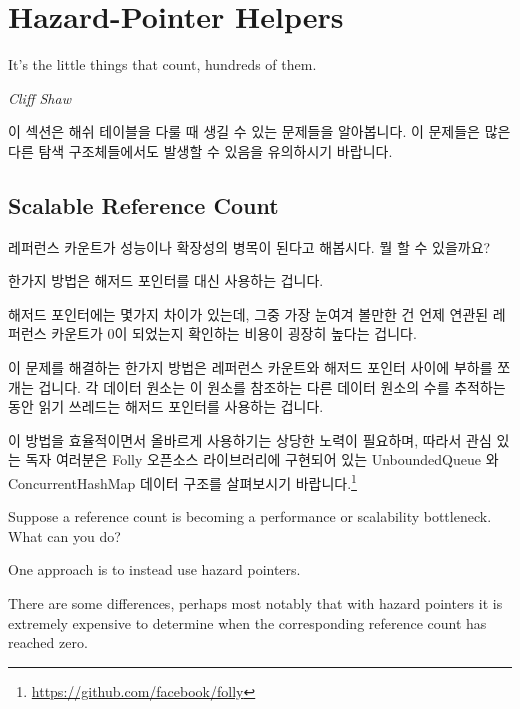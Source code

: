
\section{Hazard-Pointer Helpers}
\label{sec:together:Hazard-Pointer Helpers}
%
\epigraph{It's the little things that count, hundreds of them.}
	 {\emph{Cliff Shaw}}

이 섹션은 해쉬 테이블을 다룰 때 생길 수 있는 문제들을 알아봅니다.
이 문제들은 많은 다른 탐색 구조체들에서도 발생할 수 있음을 유의하시기 바랍니다.

\iffalse

This section looks at some issues that can arise when dealing with
hash tables.
Please note that these issues also apply to many other search structures.

\fi

\subsection{Scalable Reference Count}
\label{sec:together:Scalable Reference Count}

레퍼런스 카운트가 성능이나 확장성의 병목이 된다고 해봅시다.
뭘 할 수 있을까요?

한가지 방법은 해저드 포인터를 대신 사용하는 겁니다.

해저드 포인터에는 몇가지 차이가 있는데, 그중 가장 눈여겨 볼만한 건 언제 연관된
레퍼런스 카운트가 0이 되었는지 확인하는 비용이 굉장히 높다는 겁니다.

이 문제를 해결하는 한가지 방법은 레퍼런스 카운트와 해저드 포인터 사이에 부하를
쪼개는 겁니다.
각 데이터 원소는 이 원소를 참조하는 다른 데이터 원소의 수를 추적하는 동안 읽기
쓰레드는 해저드 포인터를 사용하는 겁니다.

이 방법을 효율적이면서 올바르게 사용하기는 상당한 노력이 필요하며, 따라서 관심
있는 독자 여러분은 Folly 오픈소스 라이브러리에 구현되어 있는 UnboundedQueue 와
ConcurrentHashMap 데이터 구조를 살펴보시기 바랍니다.\footnote{
	\url{https://github.com/facebook/folly}}

\iffalse

Suppose a reference count is becoming a performance or scalability
bottleneck.
What can you do?

One approach is to instead use hazard pointers.

There are some differences, perhaps most notably that with
hazard pointers it is extremely expensive to determine when
the corresponding reference count has reached zero.

